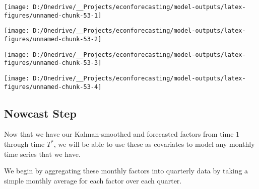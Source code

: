 \documentclass[11pt, letterpaper]{article}\usepackage[]{graphicx}\usepackage[]{color}
\begin{document}
{\centering \texttt{[image: D:/Onedrive/\_\_Projects/econforecasting/model-outputs/latex-figures/unnamed-chunk-53-1]} 

}




{\centering \texttt{[image: D:/Onedrive/\_\_Projects/econforecasting/model-outputs/latex-figures/unnamed-chunk-53-2]} 

}




{\centering \texttt{[image: D:/Onedrive/\_\_Projects/econforecasting/model-outputs/latex-figures/unnamed-chunk-53-3]} 

}




{\centering \texttt{[image: D:/Onedrive/\_\_Projects/econforecasting/model-outputs/latex-figures/unnamed-chunk-53-4]} 

}





\subsection{Nowcast Step}
Now that we have our Kalman-smoothed and forecasted factors from time $1$ through time $T^*$, we will be able to use these as covariates to model any monthly time series that we have.

We begin by aggregating these monthly factors into quarterly data by taking a simple monthly average for each factor over each quarter.
\end{document}

